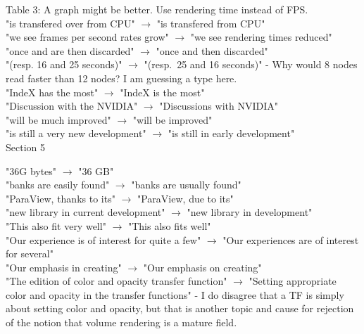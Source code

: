 \documentclass[]{article}
\begin{document}
Table 3: A graph might be better. Use rendering time instead of FPS.\\

"is transfered over from CPU" $\rightarrow$ "is transfered from CPU"\\

"we see frames per second rates grow" $\rightarrow$ "we see rendering times reduced"\\

"once and are then discarded" $\rightarrow$ "once and then discarded"\\

"(resp.  16 and 25 seconds)" $\rightarrow$ "(resp.~25 and 16 seconds)" - Why would 8 nodes read faster than 12 nodes? I am guessing a type here.\\

"IndeX has the most" $\rightarrow$ "IndeX is the most"\\

"Discussion with the NVIDIA" $\rightarrow$ "Discussions with NVIDIA"\\

"will be much improved" $\rightarrow$ "will be improved"\\

"is still a very new development" $\rightarrow$ "is still in early development"\\


Section 5

"36G bytes" $\rightarrow$ "36 GB"\\

"banks are easily found" $\rightarrow$ "banks are usually found"\\

"ParaView, thanks to its" $\rightarrow$ "ParaView, due to its"\\

"new library in current development" $\rightarrow$ "new library in development"\\

"This also fit very well" $\rightarrow$ "This also fits well"\\

"Our experience is of interest for quite a few" $\rightarrow$ "Our experiences are of interest for several"\\

"Our emphasis in creating" $\rightarrow$ "Our emphasis on creating"\\

"The edition of color and opacity transfer function" $\rightarrow$ "Setting appropriate color and opacity in the transfer functions" - I do disagree that a TF is simply about setting color and opacity, but that is another topic and cause for rejection of the notion that volume rendering is a mature field.\\
\end{document}
